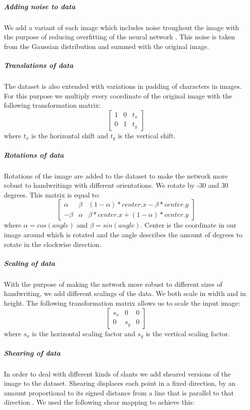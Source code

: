 \documentclass{article}
\begin{document}
\subparagraph{Adding noise to data}
We add a variant of each image which includes noise troughout the image with the purpose of reducing overfitting of the neural network \cite{DataNoise}. This noise is taken from the Gaussian distribution and summed with the original image.  
\subparagraph{Translations of data}
The dataset is also extended with variations in padding of characters in images. For this purpose we multiply every coordinate of the original image with the following transformation matrix: 
\begin{equation}
        \begin{bmatrix}
                1 & 0 & t_x \\
                0 & 1 & t_y
        \end{bmatrix}
\end{equation}
where $t_x$ is the horizontal shift and $t_y$ is the vertical shift. 
\subparagraph{Rotations of data}
Rotations of the image are added to the dataset to make the network more robust to handwritings with different orientations. We rotate by -30 and 30 degrees. This matrix is equal to:
\begin{equation}
       \begin{bmatrix}
               \alpha & \beta & (1-\alpha)*center.x - \beta*center.y \\
               -\beta & \alpha & \beta*center.x + (1-\alpha)*center.y
       \end{bmatrix}
\end{equation}
where $\alpha = cos(angle)$ and $\beta = sin(angle)$. Center is the coordinate in our image around which is rotated and the angle describes the amount of degrees to rotate in the clockwise direction. 
\subparagraph{Scaling of data}
With the purpose of making the network more robust to different sizes of handwriting, we add different scalings of the data. We both scale in width and in height. The following transformation matrix allows us to scale the input image: 
\begin{equation}
       \begin{bmatrix}
               s_x & 0 & 0  \\
               0 & s_y & 0
       \end{bmatrix}
\end{equation}
where $s_x$ is the horizontal scaling factor and $s_y$ is the vertical scaling factor. 
\subparagraph{Shearing of data}
In order to deal with different kinds of slants we add sheared versions of the image to the dataset. 
Shearing displaces each point in a fixed direction, by an amount proportional to its signed distance from a line that is parallel to that direction \cite{Shear}. We used the following shear mapping to achieve this: 
\end{document}
